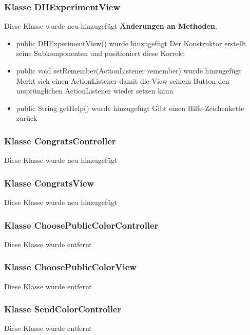 \documentclass{article}
\begin{document}
	\subsubsection{Klasse DHExperimentView}
    Diese Klasse wurde neu hinzugefügt
    \textbf{Änderungen an Methoden.}\newline
	   \begin{itemize}
           \item public DHExperimentView() wurde hinzugefügt\newline
               Der Konstruktor erstellt seine Subkomponenten und
               positioniert diese Korrekt
           \item public void setRemember(ActionListener remember) wurde hinzugefügt\newline
               Merkt sich einen ActionListener damit die View seinem Button den ursprünglichen
               ActionListener wieder setzen kann
           \item public String getHelp() wurde hinzugefügt\newline
               Gibt einen Hilfe-Zeichenkette zurück
           \end{itemize}

	\subsubsection{Klasse CongratsController}
    Diese Klasse wurde neu hinzugefügt

	\subsubsection{Klasse CongratsView}
    Diese Klasse wurde neu hinzugefügt

	\subsubsection{Klasse ChoosePublicColorController}
    Diese Klasse wurde entfernt

	\subsubsection{Klasse ChoosePublicColorView}
    Diese Klasse wurde entfernt

	\subsubsection{Klasse SendColorController}
    Diese Klasse wurde entfernt
\end{document}
